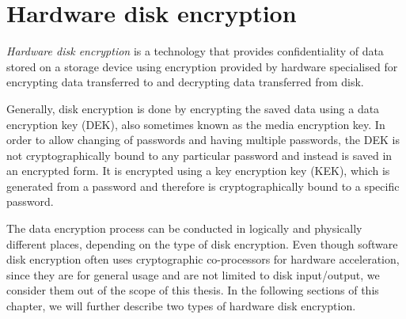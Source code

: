 
\chapter{Hardware disk encryption}
\label{chapter_hardware_disk_encryption}

\emph{Hardware disk encryption} is a technology that provides confidentiality of data stored on a storage device using encryption provided by hardware specialised for encrypting data transferred to and decrypting data transferred from disk.



Generally, disk encryption is done by encrypting the saved data using a data encryption key (DEK), also sometimes known as the media encryption key. In order to allow changing of passwords and having multiple passwords, the DEK is not cryptographically bound to any particular password and instead is saved in an encrypted form. It is encrypted using a key encryption key (KEK), which is generated from a password and therefore is cryptographically bound to a specific password.


The data encryption process can be conducted in logically and physically different places, depending on the type of disk encryption. 
Even though software disk encryption often uses cryptographic co-processors for hardware acceleration, since they are for general usage and are not limited to disk input/output, we consider them out of the scope of this thesis.
In the following sections of this chapter, we will further describe two types of hardware disk encryption.





